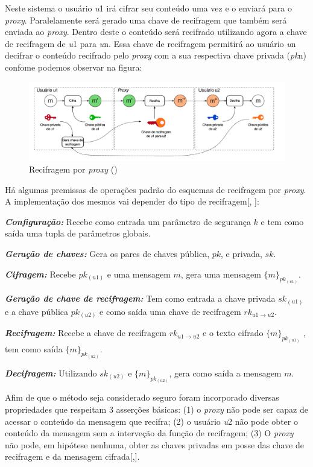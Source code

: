 Neste sistema o usuário \emph{u}1 irá cifrar seu conteúdo uma vez e o enviará para o \emph{proxy}. Paralelamente será gerado uma chave de recifragem que também será enviada ao \emph{proxy}. Dentro deste o conteúdo será recifrado utilizando agora a chave de recifragem de \emph{u}1 para \emph{u}n. Essa chave de recifragem permitirá ao usuário \emph{u}n decifrar o conteúdo recifrado pelo \emph{proxy} com a sua respectiva chave privada (\emph{pk}n) confome podemos observar na figura:
\begin{figure}[H]
\includegraphics[width=17cm]{Figuras/recifragemPorProxy.png}
\caption{Recifragem por \emph{proxy} (\cite{mannes2016controle})} 
\label{figura:RecifragemProxy} 
\end{figure}

Há algumas premissas de operações padrão do esquemas de recifragem por \emph{proxy}. A implementação dos mesmos vai depender do tipo de recifragem[\cite{ateniese2006improved}, \cite{chow2010efficient}]:

\textbf{\textit{Configuração:}} Recebe como entrada um parâmetro de segurança $k$ e tem como saída uma tupla de parâmetros globais. 

\textbf{\textit{Geração de chaves:}} Gera os pares de chaves pública, $pk$, e privada, $sk$.

\textbf{\textit{Cifragem:}} Recebe $pk_{(u1)}$ e uma mensagem $m$, gera uma mensagem $\{m\}_{pk_{(u1)}}$.

\textbf{\textit{Geração de chave de recifragem:}} Tem como entrada a chave privada $sk_{(u1)}$ e a chave pública $pk_{(u2)}$ e como saída uma chave de recifragem $rk_{u1 \rightarrow u2}$.

\textbf{\textit{Recifragem:}} Recebe a chave de recifragem $rk_{u1 \rightarrow u2}$ e o texto cifrado $\{m\}_{pk_{(u1)}}$ , tem como saída $\{m\}_{pk_{(u2)}}$.

\textbf{\textit{Decifragem:}} Utilizando $sk_{(u2)}$ e $\{m\}_{pk_{(u2)}}$, gera como saída a mensagem $m$.

Afim de que o método seja considerado seguro foram incorporado diversas propriedades que respeitam 3 asserções básicas: (1) o \emph{proxy} não pode ser capaz de acessar o conteúdo da mensagem que recifra; (2) o usuário \emph{u}2 não pode obter o conteúdo da mensagem sem a interveção da função de recifragem; (3) O \emph{proxy} não pode, em hipótese nenhuma, obter as chaves privadas em posse das chave de recifragem e da mensagem cifrada[\cite{matsuo2007proxy},\cite{zhu2010new}].

